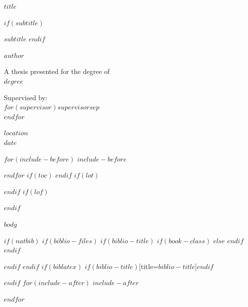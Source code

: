 \documentclass[$if(fontsize)$$fontsize$,$endif$$if(lang)$$lang$,$endif$$if(papersize)$$papersize$,$endif$$for(classoption)$$classoption$$sep$,$endfor$]{$documentclass$}
\begin{document}
\begin{titlepage}
    \begin{center}


        \vspace*{2.5cm}

        \huge
        $title$

        $if(subtitle)$
        \vspace{.5cm}

        \Large
        $subtitle$
        $endif$


        \vspace{1.5cm}

        \Large
        $author$

        \vspace{1.5cm}

        \normalsize
        A thesis presented for the degree of\\
        $degree$

        \vfill

        \normalsize
        Supervised by:\\
        $for(supervisor)$$supervisor$$sep$ \\ $endfor$

        \vspace{0.8cm}


        \normalsize
        $location$\\
        $date$


    \end{center}
\end{titlepage}

$for(include-before)$
$include-before$

$endfor$
$if(toc)$
{
\hypersetup{linkcolor=black}
\setcounter{tocdepth}{$toc-depth$}
\tableofcontents
}
$endif$
$if(lot)$
\listoftables
$endif$
$if(lof)$
\listoffigures
$endif$

$body$

$if(natbib)$
$if(biblio-files)$
$if(biblio-title)$
$if(book-class)$
\renewcommand\bibname{$biblio-title$}
$else$
\renewcommand\refname{$biblio-title$}
$endif$
$endif$


$endif$
$endif$
$if(biblatex)$
\printbibliography$if(biblio-title)$[title=$biblio-title$]$endif$

$endif$
$for(include-after)$
$include-after$

$endfor$
\end{document}
